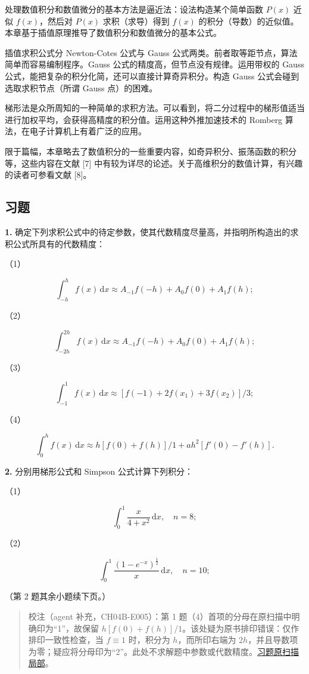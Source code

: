 处理数值积分和数值微分的基本方法是逼近法：设法构造某个简单函数 \(P(x)\) 近似 \(f(x)\)，然后对 \(P(x)\) 求积（求导）得到 \(f(x)\) 的积分（导数）的近似值。本章基于插值原理推导了数值积分和数值微分的基本公式。

插值求积公式分 Newton-Cotes 公式与 Gauss 公式两类。前者取等距节点，算法简单而容易编制程序。Gauss 公式的精度高，但节点没有规律。运用带权的 Gauss 公式，能把复杂的积分化简，还可以直接计算奇异积分。构造 Gauss 公式会碰到选取求积节点（所谓 Gauss 点）的困难。

梯形法是众所周知的一种简单的求积方法。可以看到，将二分过程中的梯形值适当进行加权平均，会获得高精度的积分值。运用这种外推加速技术的 Romberg 算法，在电子计算机上有着广泛的应用。

限于篇幅，本章略去了数值积分的一些重要内容，如奇异积分、振荡函数的积分等，这些内容在文献 {[}7{]} 中有较为详尽的论述。关于高维积分的数值计算，有兴趣的读者可参看文献 {[}8{]}。

\subsection{习题}\label{ch04b-ux4e60ux9898}

\textbf{1.} 确定下列求积公式中的待定参数，使其代数精度尽量高，并指明所构造出的求积公式所具有的代数精度：

（1）

\[
\int_{-h}^{h}f(x)\,\mathrm{d}x\approx A_{-1}f(-h)+A_0f(0)+A_1f(h);
\]

（2）

\[
\int_{-2h}^{2h}f(x)\,\mathrm{d}x\approx A_{-1}f(-h)+A_0f(0)+A_1f(h);
\]

（3）

\[
\int_{-1}^{1}f(x)\,\mathrm{d}x\approx[f(-1)+2f(x_1)+3f(x_2)]/3;
\]

（4）

\[
\int_0^h f(x)\,\mathrm{d}x\approx h[f(0)+f(h)]/1+ah^2[f'(0)-f'(h)].
\]

\textbf{2.} 分别用梯形公式和 Simpson 公式计算下列积分：

（1）

\[
\int_0^1\frac{x}{4+x^2}\,\mathrm{d}x,\quad n=8;
\]

（2）

\[
\int_0^1\frac{(1-e^{-x})^{\frac12}}{x}\,\mathrm{d}x,\quad n=10;
\]

（第 2 题其余小题续下页。）

\begin{quote}
校注（agent 补充，CH04B-E005）：第 1 题（4）首项的分母在原扫描中明确印为``1''，故保留 \(h[f(0)+f(h)]/1\)。该处疑为原书排印错误：仅作排印一致性检查，当 \(f\equiv1\) 时，积分为 \(h\)，而所印右端为 \(2h\)，并且导数项为零；疑应将分母印为``2''。此处不求解题中参数或代数精度。\href{verified/assets/ch04b/review-p117-exercises.png}{习题原扫描局部}。
\end{quote}

